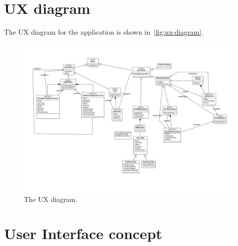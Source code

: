 \section{UX diagram}

The UX diagram for the application is shown in~\autoref{fig:ux-diagram}.
\begin{figure}
\centering
\includegraphics[width=\textwidth]{diagrams/UXdiagramSE2}
\caption{The UX diagram.}
\label{fig:ux-diagram}
\end{figure}

\section{User Interface concept}
